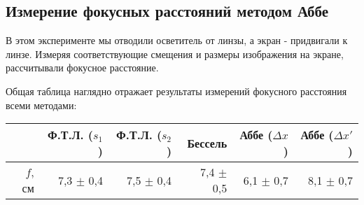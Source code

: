 \subsection*{Измерение фокусных расстояний методом Аббе}
В этом эксперименте мы отводили осветитель от линзы, а экран - придвигали к линзе. Измеряя соответствующие смещения и размеры изображения на экране, рассчитывали фокусное расстояние.

\begin{table}[H]
\centering
{}
\end{table}

\n
Общая таблица наглядно отражает результаты измерений фокусного расстояния всеми методами:
\begin{table}[H]
\centering
\begin{tabular}{|r|r|r|r|r|r|}
\hline
  & Ф.Т.Л. ($s_1$) & Ф.Т.Л. ($s_2$) & Бессель  & Аббе ($\Delta x$) & Аббе ($\Delta x'$) \\ \hline
$f$, см & 7,3  $\pm$ 0,4  & 7,5  $\pm$ 0,4 & 7,4  $\pm$ 0,5 & 6,1 $\pm$ 0,7 & 8,1 $\pm$ 0,7 \\ \hline
\end{tabular}
\end{table}

